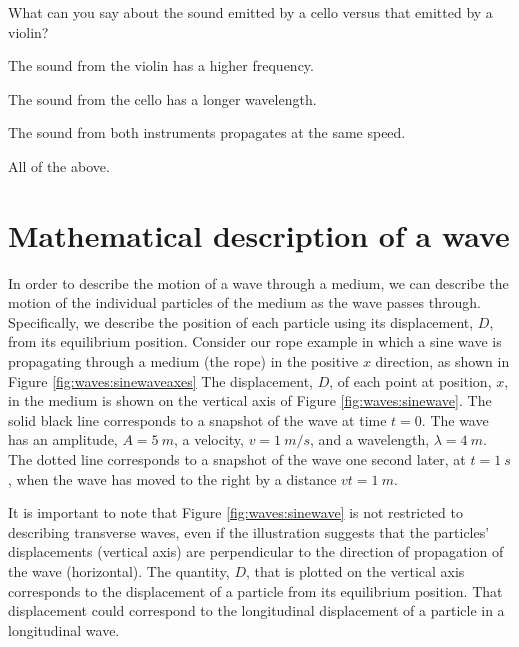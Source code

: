 \begin{checkpoint}
\begin{MCquestion}{What can you say about the sound emitted by a cello versus that emitted by a violin?}
\item The sound from the violin has a higher frequency.
\item The sound from the cello has a longer wavelength.
\item The sound from both instruments propagates at the same speed.
\item All of the above. \correct
\end{MCquestion}
\end{checkpoint}

\section{Mathematical description of a wave}
In order to describe the motion of a wave through a medium, we can describe the motion of the individual particles of the medium as the wave passes through. Specifically, we describe the position of each particle using its displacement, $D$, from its equilibrium position. Consider our rope example in which a sine wave is propagating through a medium (the rope) in the positive $x$ direction, as shown in Figure \ref{fig:waves:sinewaveaxes}
{}
The displacement, $D$, of each point at position, $x$, in the medium is shown on the vertical axis of Figure \ref{fig:waves:sinewave}. The solid black line corresponds to a snapshot of the wave at time $t=0$. The wave has an amplitude, $A=\SI{5}{m}$, a velocity, $v=\SI{1}{m/s}$, and a wavelength, $\lambda=\SI{4}{m}$. The dotted line corresponds to a snapshot of the wave one second later, at $t=\SI{1}{s}$, when the wave has moved to the right by a distance $vt=\SI{1}{m}$.

It is important to note that Figure \ref{fig:waves:sinewave} is not restricted to describing transverse waves, even if the illustration suggests that the particles' displacements (vertical axis) are perpendicular to the direction of propagation of the wave (horizontal). The quantity, $D$, that is plotted on the vertical axis corresponds to the displacement of a particle from its equilibrium position. That displacement could correspond to the longitudinal displacement of a particle in a longitudinal wave.

